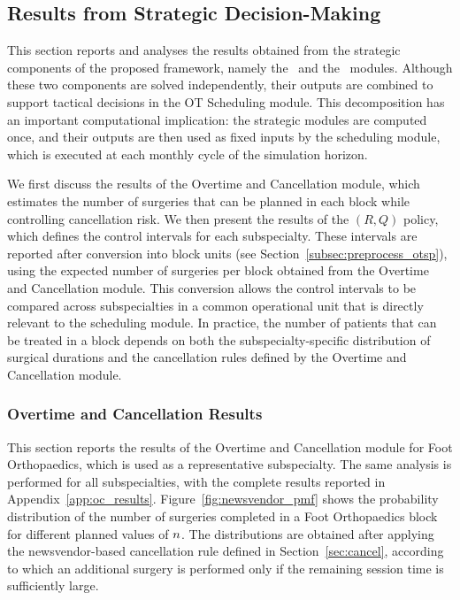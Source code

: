 \subsection{Results from Strategic Decision-Making\label{sec:longterm_analysis}}
This section reports and analyses the results obtained from the strategic components of the proposed framework, namely the \rqmodule~and the \overtimemodule~modules. 
Although these two components are solved independently, their outputs are combined to support tactical decisions in the OT Scheduling module. 
This decomposition has an important computational implication: the strategic modules are computed once, and their outputs are then used as fixed inputs by the scheduling module, which is executed at each monthly cycle of the simulation horizon.

We first discuss the results of the Overtime and Cancellation module, which estimates the number of surgeries that can be planned in each block while controlling cancellation risk. 
We then present the results of the $(R,Q)$ policy, which defines the control intervals for each subspecialty. 
These intervals are reported after conversion into block units (see Section~\ref{subsec:preprocess_otsp}), using the expected number of surgeries per block obtained from the Overtime and Cancellation module. 
This conversion allows the control intervals to be compared across subspecialties in a common operational unit that is directly relevant to the scheduling module. 
In practice, the number of patients that can be treated in a block depends on both the subspecialty-specific distribution of surgical durations and the cancellation rules defined by the Overtime and Cancellation module.

\subsubsection{Overtime and Cancellation Results\label{sec:overtime_results}}
This section reports the results of the Overtime and Cancellation module for Foot Orthopaedics, which is used as a representative subspecialty. 
The same analysis is performed for all subspecialties, with the complete results reported in Appendix~\ref{app:oc_results}. 
Figure~\ref{fig:newsvendor_pmf} shows the probability distribution of the number of surgeries completed in a Foot Orthopaedics block for different planned values of $n$. 
The distributions are obtained after applying the newsvendor-based cancellation rule defined in Section~\ref{sec:cancel}, according to which an additional surgery is performed only if the remaining session time is sufficiently large.

